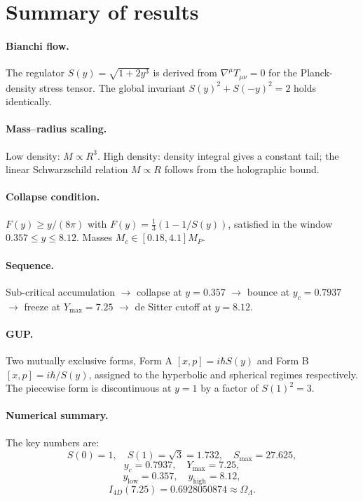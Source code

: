 \documentclass[12pt,oneside,openany]{book}
\begin{document}
\section{Summary of results}

\paragraph{Bianchi flow.}
The regulator $S(y)=\sqrt{1+2y^{3}}$ is derived from
$\nabla^{\mu}T_{\mu\nu}=0$ for the Planck-density stress
tensor. The global invariant
$S(y)^{2}+S(-y)^{2}=2$ holds identically.

\paragraph{Mass--radius scaling.}
Low density: $M\propto R^{3}$. High density: density integral
gives a constant tail; the linear Schwarzschild relation
$M\propto R$ follows from the holographic bound.

\paragraph{Collapse condition.}
$F(y)\geq y/(8\pi)$ with
$F(y)=\frac{1}{3}(1-1/S(y))$, satisfied in the window
$0.357\leq y\leq 8.12$. Masses $M_{c}\in[0.18,4.1]M_{P}$.

\paragraph{Sequence.}
Sub-critical accumulation $\to$ collapse at $y=0.357$ $\to$
bounce at $y_{c}=0.7937$ $\to$ freeze at $Y_{\max}=7.25$ $\to$
de Sitter cutoff at $y=8.12$.

\paragraph{GUP.}
Two mutually exclusive forms, Form A
$[x,p]=i\hbar S(y)$ and Form B $[x,p]=i\hbar/S(y)$, assigned
to the hyperbolic and spherical regimes respectively. The
piecewise form is discontinuous at $y=1$ by a factor of
$S(1)^{2}=3$.

\paragraph{Numerical summary.}
The key numbers are:
\begin{equation}
S(0)=1,\quad S(1)=\sqrt{3}=1.732,\quad S_{\max}=27.625,
\end{equation}
\begin{equation}
y_{c}=0.7937,\quad Y_{\max}=7.25,
\end{equation}
\begin{equation}
y_{\text{low}}=0.357,\quad y_{\text{high}}=8.12,
\end{equation}
\begin{equation}
I_{4D}(7.25)=0.6928050874\approx\Omega_{\Lambda}.
\end{equation}
\end{document}

